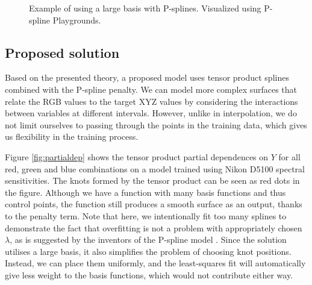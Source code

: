 \begin{figure}
    \centering
    \caption{Example of using a large basis with P-splines. Visualized using P-spline Playgrounds\cite{psplinesJoysPsplines}.}
    \label{fig:largebasis}
\end{figure}

\subsection{Proposed solution}

Based on the presented theory, a proposed model uses tensor product splines combined with the P-spline penalty. We can model more complex surfaces that relate the RGB values to the target XYZ values by considering the interactions between variables at different intervals. However, unlike in interpolation, we do not limit ourselves to passing through the points in the training data, which gives us flexibility in the training process.

Figure \ref{fig:partialdep} shows the tensor product partial dependences on $Y$ for all red, green and blue combinations on a model trained using Nikon D5100 spectral sensitivities. The knots formed by the tensor product can be seen as red dots in the figure. Although we have a function with many basis functions and thus control points, the function still produces a smooth surface as an output, thanks to the penalty term. Note that here, we intentionally fit too many splines to demonstrate the fact that overfitting is not a problem with appropriately chosen $\lambda$, as is suggested by the inventors of the P-spline model \cite{eilers2021psplines}. Since the solution utilises a large basis, it also simplifies the problem of choosing knot positions. Instead, we can place them uniformly, and the least-squares fit will automatically give less weight to the basis functions, which would not contribute either way.

